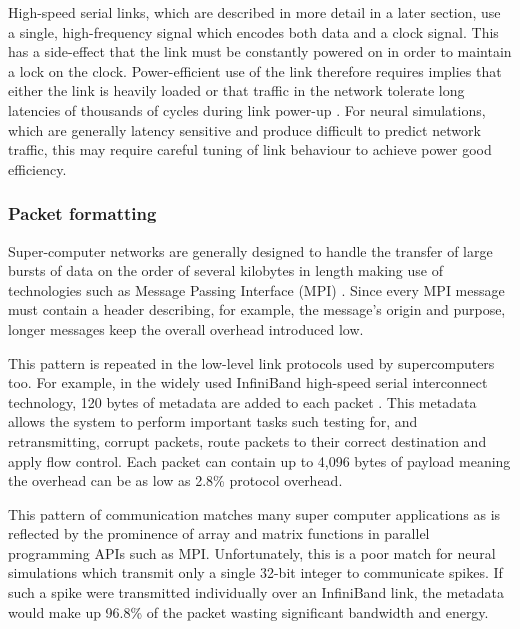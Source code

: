 				High-speed serial links, which are described in more detail in a later
				section, use a single, high-frequency signal which encodes both data and
				a clock signal. This has a side-effect that the link must be constantly
				powered on in order to maintain a lock on the clock.  Power-efficient
				use of the link therefore requires implies that either the link is
				heavily loaded or that traffic in the network tolerate long latencies of
				thousands of cycles during link power-up \cite{soteriou03}. For neural
				simulations, which are generally latency sensitive and produce difficult
				to predict network traffic, this may require careful tuning of link
				behaviour to achieve power good efficiency.
				
			
			\subsubsection{Packet formatting}
				
				Super-computer networks are generally designed to handle the transfer of
				large bursts of data on the order of several kilobytes in length making
				use of technologies such as Message Passing Interface (MPI)
				\cite{mpiforum12}. Since every MPI message must contain a header
				describing, for example, the message's origin and purpose, longer
				messages keep the overall overhead introduced low.
				
				This pattern is repeated in the low-level link protocols used by
				supercomputers too.  For example, in the widely used InfiniBand
				high-speed serial interconnect technology, 120 bytes of metadata are
				added to each packet \cite{infinibandta08}. This metadata allows the
				system to perform important tasks such testing for, and retransmitting,
				corrupt packets, route packets to their correct destination and apply
				flow control. Each packet can contain up to 4,096 bytes of payload
				meaning the overhead can be as low as 2.8\% protocol overhead.
				
				This pattern of communication matches many super computer applications
				as is reflected by the prominence of array and matrix functions in
				parallel programming APIs such as MPI. Unfortunately, this is a poor
				match for neural simulations which transmit only a single 32-bit integer
				to communicate spikes. If such a spike were transmitted individually
				over an InfiniBand link, the metadata would make up 96.8\% of the packet
				wasting significant bandwidth and energy.
				
